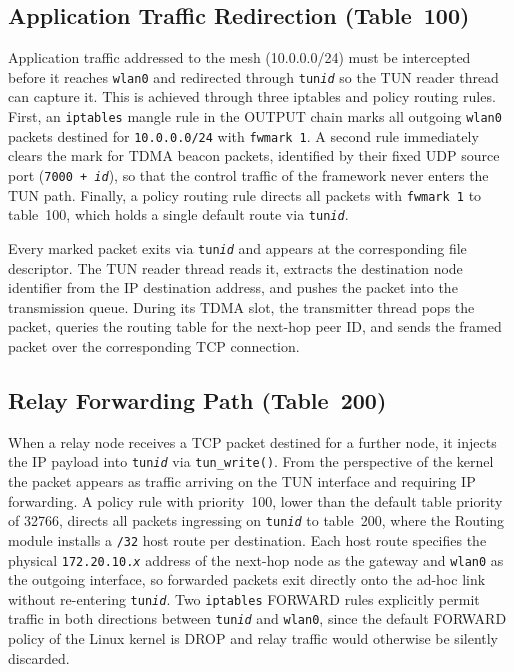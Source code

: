 \subsection{Application Traffic Redirection (Table~100)}

Application traffic addressed to the mesh (10.0.0.0/24) must be intercepted before it
reaches \texttt{wlan0} and redirected through \texttt{tun\textit{id}} so the TUN reader
thread can capture it. This is achieved through three iptables and policy routing rules.
First, an \texttt{iptables} mangle rule in the OUTPUT chain marks all outgoing
\texttt{wlan0} packets destined for \texttt{10.0.0.0/24} with \texttt{fwmark~1}. A second
rule immediately clears the mark for TDMA beacon packets, identified by their fixed UDP
source port (\texttt{7000\,+\,\textit{id}}), so that the control traffic of the framework
never enters the TUN path. Finally, a policy routing rule directs all packets with
\texttt{fwmark~1} to table~100, which holds a single default route via
\texttt{tun\textit{id}}.

Every marked packet exits via \texttt{tun\textit{id}} and appears at the corresponding
file descriptor. The TUN reader thread reads it, extracts the destination node identifier
from the IP destination address, and pushes the packet into the transmission queue. During
its TDMA slot, the transmitter thread pops the packet, queries the routing table for the
next-hop peer ID, and sends the framed packet over the corresponding TCP connection.

\subsection{Relay Forwarding Path (Table~200)}

When a relay node receives a TCP packet destined for a further node, it injects the IP
payload into \texttt{tun\textit{id}} via \texttt{tun\_write()}. From the perspective of the kernel
the packet appears as traffic arriving on the TUN interface and requiring IP
forwarding. A policy rule with priority~100, lower than the default table priority of
32766, directs all packets ingressing on \texttt{tun\textit{id}} to table~200, where
the Routing module installs a \texttt{/32} host route per destination. Each host route
specifies the physical \texttt{172.20.10.\textit{x}} address of the next-hop node as the
gateway and \texttt{wlan0} as the outgoing interface, so forwarded packets exit directly
onto the ad-hoc link without re-entering \texttt{tun\textit{id}}. Two \texttt{iptables}
FORWARD rules explicitly permit traffic in both directions between \texttt{tun\textit{id}}
and \texttt{wlan0}, since the default FORWARD policy of the Linux kernel is DROP and relay
traffic would otherwise be silently discarded.

